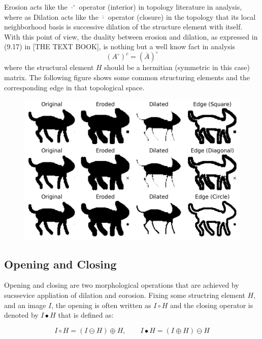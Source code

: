 \documentclass[11pt,a4paper]{article}
\theoremstyle{definition}
\theoremstyle{remark}
\begin{document}
	Erosion acts like the $\cdot^\circ$ operator (interior) in topology literature in analysis, where as Dilation acts like the $\overline{\cdot}$ operator (closure) in the topology that its local neighborhood basis is successive dilation of the structure element with itself. With this point of view, the duality between erosion and dilation, as expressed in (9.17) in [THE TEXT BOOK], is nothing but a well know fact in analysis
	\[ (A^\circ)^c = (\overline{A})^\circ \]
	where  the structural element $ H $ should be a hermitian (symmetric in this case) matrix. The following figure shows some common structuring elements and the corresponding edge in that topological space.
	
	\begin{figure}[h!]
		\centering
		\includegraphics[width=0.5\linewidth]{images/all_kernels_results}

		\label{fig:allkernelsresults}
	\end{figure}
	\FloatBarrier
	
	\subsection*{Opening and Closing}
	Opening and closing are two morphological operations that are achieved by sucssevice appliation of dilation and eorosion. Fixing some structring element $H$, and an image $I$, the opening is often written as $I\circ H$ and the closing operator is denoted by $I \bullet H$ that is defined as:
	
	
	
	\[ I\circ H = (I\ominus H) \oplus H, \qquad I\bullet H = (I\oplus H) \ominus H \]
	
	
	
\end{document}
